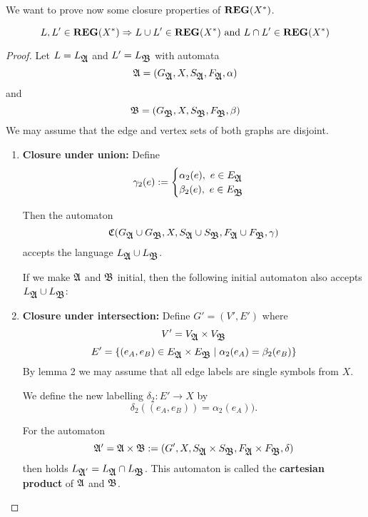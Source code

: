 \begin{center}

\end{center}

\bigskip
We want to prove now some closure properties of $\mbox{{\bf REG}}(X^*)$.

\begin{theorem}
\[ L, L' \in \mbox{{\bf REG}}(X^*) \Rightarrow L \cup L' \in \mbox{{\bf REG}}(X^*)\text{ and }
L \cap L' \in \mbox{{\bf REG}}(X^*) \]
\end{theorem}

\begin{proof}
Let $L = L_{\mbox{$\mathfrak{A}$}}$ and $L' = L_{\mbox{$\mathfrak{B}$}}$ with automata
\[ \mbox{$\mathfrak{A}$} = (G_{\mbox{$\mathfrak{A}$}}, X, S_{\mbox{$\mathfrak{A}$}}, F_{\mbox{$\mathfrak{A}$}}, \alpha) \]
and
\[ \mbox{$\mathfrak{B}$} = (G_{\mbox{$\mathfrak{B}$}}, X, S_{\mbox{$\mathfrak{B}$}}, F_{\mbox{$\mathfrak{B}$}}, \beta) \]
We may assume that the edge and vertex sets of both graphs are disjoint.

\begin{enumerate}
  
  \item {\bf Closure under union:} Define
	\[ \gamma_2(e) := \begin{cases}
		\alpha_2(e),\ e \in E_{\mbox{$\mathfrak{A}$}} \\
		\beta_2(e),\ e \in E_{\mbox{$\mathfrak{B}$}}
	\end{cases} \]
	
	Then the automaton
	\[ \mbox{$\mathfrak{C}$} (G_{\mbox{$\mathfrak{A}$}} \cup G_{\mbox{$\mathfrak{B}$}}, X, S_{\mbox{$\mathfrak{A}$}} \cup
	S_{\mbox{$\mathfrak{B}$}}, F_{\mbox{$\mathfrak{A}$}} \cup F_{\mbox{$\mathfrak{B}$}}, \gamma) \]
	accepts the language $L_{\mbox{$\mathfrak{A}$}} \cup L_{\mbox{$\mathfrak{B}$}}$.

	If we make $\mbox{$\mathfrak{A}$}$ and $\mbox{$\mathfrak{B}$}$ initial, then the following initial automaton
	also accepts $L_{\mbox{$\mathfrak{A}$}} \cup L_{\mbox{$\mathfrak{B}$}}$:
		
	\begin{center}
	
	\end{center}
	
	\item {\bf Closure under intersection:} Define $G' = (V', E')$ where
	\[ V' = V_{\mbox{$\mathfrak{A}$}} \times V_{\mbox{$\mathfrak{B}$}} \]
	\[ E' = \mbox{$\{(e_A, e_B) \in E_{\mbox{$\mathfrak{A}$}} \times E_{\mbox{$\mathfrak{B}$}} \mid \alpha_2(e_A) =
	\beta_2(e_B)\}$} \]
	By lemma 2 we may assume that all edge labels are single symbols from $X$.
	
	We define the new labelling $\delta_2 : E' \to X$ by
	\[ \delta_2((e_A, e_B)) = \alpha_2(e_A)). \]
	
	For the automaton
	\[ \mbox{$\mathfrak{A'}$} = \mbox{$\mathfrak{A}$} \times \mbox{$\mathfrak{B}$} := (G', X, S_{\mbox{$\mathfrak{A}$}} \times S_{\mbox{$\mathfrak{B}$}},
	F_{\mbox{$\mathfrak{A}$}} \times F_{\mbox{$\mathfrak{B}$}}, \delta) \]
	then holds	$L_{\mbox{$\mathfrak{A}$}'} = L_{\mbox{$\mathfrak{A}$}} \cap L_{\mbox{$\mathfrak{B}$}}$. This automaton is called
	the {\bf cartesian product} of $\mbox{$\mathfrak{A}$}$ and $\mbox{$\mathfrak{B}$}$.
\end{enumerate}
\end{proof}


